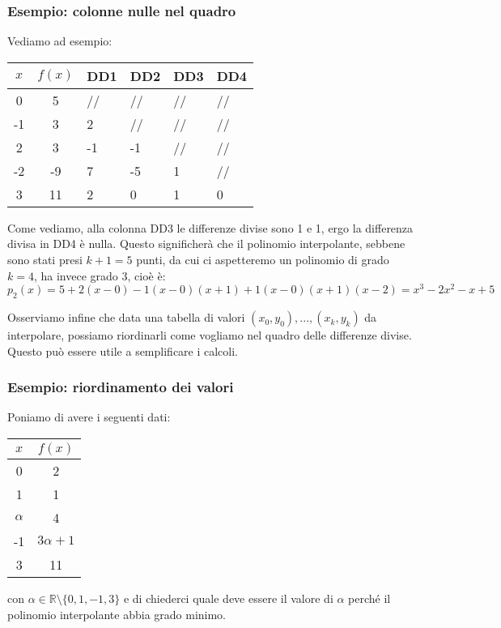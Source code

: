 \documentclass[a4paper,11pt]{article}
\begin{document}
\subsubsection{Esempio: colonne nulle nel quadro}
Vediamo ad esempio:
\begin{table}[H]
	\center 
	\begin{tabular} { c | c | p{1cm}  p{1cm} p{1cm} p{1cm} }
		$x$ & $f(x)$ & DD1 & DD2 & DD3 & DD4\\
		\hline
		0 & 5 & // & // & // & // \\
		-1 & 3 & 2 & // & // & //\\
		2 & 3 & -1 & -1 & // & // \\
		-2 & -9 & 7 &-5 & 1 & // \\
		3 & 11 & 2 & 0 & 1 & 0 
	\end{tabular}
\end{table}

Come vediamo, alla colonna DD3 le differenze divise sono 1 e 1, ergo la differenza divisa in DD4 è nulla.
Questo significherà che il polinomio interpolante, sebbene sono stati presi $k + 1 = 5$ punti, da cui ci aspetteremo un polinomio di grado $k = 4$, ha invece grado $3$, cioè è:
$$
p_2(x) = 5 + 2 (x - 0) - 1 (x - 0)(x + 1) + 1 (x - 0)(x + 1)(x - 2) = x^3 - 2x^2 - x + 5
$$

\par\smallskip

Osserviamo infine che data una tabella di valori $(x_0, y_0), ..., (x_k, y_k)$ da interpolare, possiamo riordinarli come vogliamo nel quadro delle differenze divise.
Questo può essere utile a semplificare i calcoli.

\subsubsection{Esempio: riordinamento dei valori}
Poniamo di avere i seguenti dati:
\begin{table}[H]
	\center 
	\begin{tabular} { c | c }
		$x$ & $f(x)$ \\
		\hline
		0 & 2 \\
		1 & 1 \\
		$\alpha$ & 4 \\
		-1 & $3 \alpha + 1$ \\
		3 & 11 
	\end{tabular}
\end{table}
con $\alpha \in \mathbb{R} \setminus \{ 0, 1, -1, 3 \}$ e di chiederci quale deve essere il valore di $\alpha$ perché il polinomio interpolante abbia grado minimo.
\end{document}
